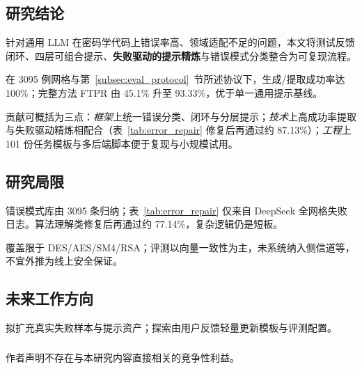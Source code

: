 \documentclass[runningheads]{llncs}
\begin{document}
\subsection{研究结论}
针对通用 LLM 在密码学代码上错误率高、领域适配不足的问题，本文将测试反馈闭环、四层可组合提示、\textbf{失败驱动的提示精炼}与错误模式分类整合为可复现流程。

在 3095 例网格与第~\ref{subsec:eval_protocol}~节所述协议下，生成/提取成功率达 100\%；完整方法 FTPR 由 45.1\% 升至 93.33\%，优于单一通用提示基线。

贡献可概括为三点：\emph{框架}上统一错误分类、闭环与分层提示；\emph{技术}上高成功率提取与失败驱动精炼相配合（表~\ref{tab:error_repair} 修复后再通过约 87.13\%）；\emph{工程}上 101 份任务模板与多后端脚本便于复现与小规模试用。

\subsection{研究局限}
错误模式库由 3095 条归纳；表~\ref{tab:error_repair} 仅来自 DeepSeek 全网格失败日志。算法理解类修复后再通过约 77.14\%，复杂逻辑仍是短板。

覆盖限于 DES/AES/SM4/RSA；评测以向量一致性为主，未系统纳入侧信道等，不宜外推为线上安全保证。

\subsection{未来工作方向}
拟扩充真实失败样本与提示资产；探索由用户反馈轻量更新模板与评测配置。


\begin{credits}
\subsubsection{\ackname}
\subsubsection{\discintname}
作者声明不存在与本研究内容直接相关的竞争性利益。
\end{credits}

\renewcommand{\refname}{参考文献}
\renewcommand{\bibname}{参考文献}

 
\end{document}
